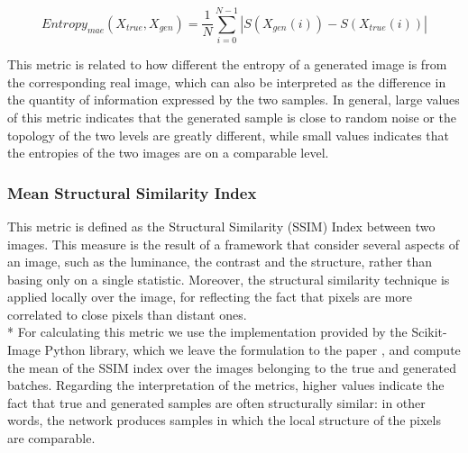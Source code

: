 \begin{equation}
Entropy_{mae}(X_{true}, X_{gen}) = \frac{1}{N}\sum_{i=0}^{N-1} | S(X_{gen}(i)) - S(X_{true}(i)) |
\end{equation}

This metric is related to how different the entropy of a generated image is from the corresponding real image, which can also be interpreted as the difference in the quantity of information expressed by the two samples. In general, large values of this metric indicates that the generated sample is close to random noise or the topology of the two levels are greatly different, while small values indicates that the entropies of the two images are on a comparable level. 

\subsubsection{Mean Structural Similarity Index}
\label{sec:similarity}
This metric is defined as the Structural Similarity (SSIM) Index \cite{ssim} between two images.  This measure is the result of a framework that consider several aspects of an image, such as the luminance, the contrast and the structure, rather than basing only on a single statistic. Moreover, the structural similarity technique is applied locally over the image, for reflecting the fact that pixels are more correlated to close pixels than distant ones. \\*
For calculating this metric we use the implementation provided by the Scikit-Image Python library, which we leave the formulation to the paper \cite[p.~604]{ssim}, and compute the mean of the SSIM index over the images belonging to the true and generated batches. Regarding the interpretation of the metrics, higher values indicate the fact that true and generated samples are often structurally similar: in other words, the network produces samples in which the local structure of the pixels are comparable.

